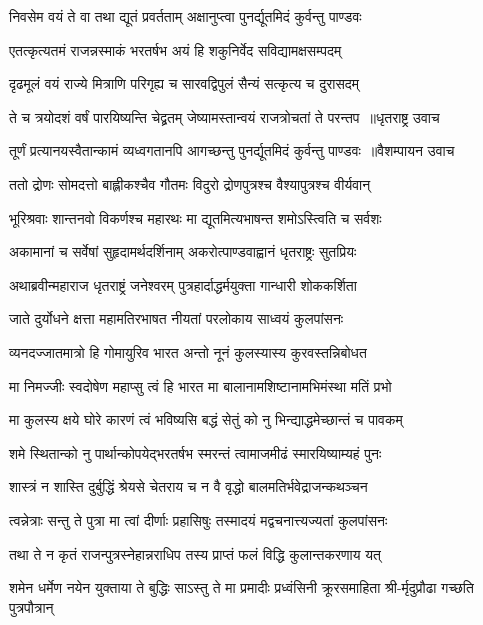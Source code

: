 \twolineshloka
{निवसेम वयं ते वा तथा द्यूतं प्रवर्तताम्}
{अक्षानुप्त्वा पुनर्द्यूतमिदं कुर्वन्तु पाण्डवः}


\twolineshloka
{एतत्कृत्यतमं राजन्नस्माकं भरतर्षभ}
{अयं हि शकुनिर्वेद सविद्यामक्षसम्पदम्}


\twolineshloka
{दृढमूलं वयं राज्ये मित्राणि परिगृह्य च}
{सारवद्विपुलं सैन्यं सत्कृत्य च दुरासदम्}


\twolineshloka
{ते च त्रयोदशं वर्षं पारयिष्यन्ति चेद्व्रतम्}
{जेष्यामस्तान्वयं राजत्रोचतां ते परन्तप ॥धृतराष्ट्र उवाच}


\twolineshloka
{तूर्णं प्रत्यानयस्वैतान्कामं व्यध्वगतानपि}
{आगच्छन्तु पुनर्द्यूतमिदं कुर्वन्तु पाण्डवः ॥वैशम्पायन उवाच}


\twolineshloka
{ततो द्रोणः सोमदत्तो बाह्लीकश्चैव गौतमः}
{विदुरो द्रोणपुत्रश्च वैश्यापुत्रश्च वीर्यवान्}


\twolineshloka
{भूरिश्रवाः शान्तनवो विकर्णश्च महारथः}
{मा द्यूतमित्यभाषन्त शमोऽस्त्विति च सर्वशः}


\twolineshloka
{अकामानां च सर्वेषां सुहृदामर्थदर्शिनाम्}
{अकरोत्पाण्डवाह्वानं धृतराष्ट्रः सुतप्रियः}


\twolineshloka
{अथाब्रवीन्महाराज धृतराष्ट्रं जनेश्वरम्}
{पुत्रहार्दाद्धर्मयुक्ता गान्धारी शोककर्शिता}


\twolineshloka
{जाते दुर्योधने क्षत्ता महामतिरभाषत}
{नीयतां परलोकाय साध्वयं कुलपांसनः}


\twolineshloka
{व्यनदज्जातमात्रो हि गोमायुरिव भारत}
{अन्तो नूनं कुलस्यास्य कुरवस्तन्निबोधत}


\twolineshloka
{मा निमज्जीः स्वदोषेण महाप्सु त्वं हि भारत}
{मा बालानामशिष्टानामभिमंस्था मतिं प्रभो}


\twolineshloka
{मा कुलस्य क्षये घोरे कारणं त्वं भविष्यसि}
{बद्धं सेतुं को नु भिन्द्याद्धमेच्छान्तं च पावकम्}


\twolineshloka
{शमे स्थितान्को नु पार्थान्कोपयेद्भरतर्षभ}
{स्मरन्तं त्वामाजमीढं स्मारयिष्याम्यहं पुनः}


\twolineshloka
{शास्त्रं न शास्ति दुर्बुद्धिं श्रेयसे चेतराय च}
{न वै वृद्धो बालमतिर्भवेद्राजन्कथञ्चन}


\twolineshloka
{त्वन्नेत्राः सन्तु ते पुत्रा मा त्वां दीर्णाः प्रहासिषुः}
{तस्मादयं मद्वचनात्त्यज्यतां कुलपांसनः}


\twolineshloka
{तथा ते न कृतं राजन्पुत्रस्नेहान्नराधिप}
{तस्य प्राप्तं फलं विद्धि कुलान्तकरणाय यत्}


\twolineshloka
{शमेन धर्मेण नयेन युक्ताया ते बुद्धिः साऽस्तु ते मा प्रमादीः}
{प्रध्वंसिनी क्रूरसमाहिता श्री-र्मृदुप्रौढा गच्छति पुत्रपौत्रान्}


